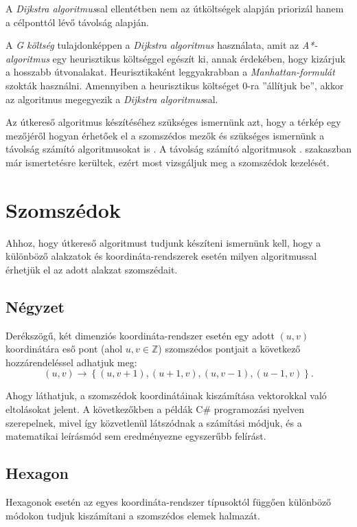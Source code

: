 A \textit{Dijkstra algoritmus}sal ellentétben nem az útköltségek alapján priorizál hanem a célponttól lévő távolság alapján.

A \textit{G költség} tulajdonképpen a \textit{Dijkstra algoritmus} használata, amit az \textit{A*-algo\-rit\-mus} egy heurisztikus költséggel egészít ki, annak érdekében, hogy kizárjuk a hosszabb útvonalakat. Heurisztikaként leggyakrabban a \textit{Manhattan-formulát} szokták használni. Amennyiben a heurisztikus költséget 0-ra ''állítjuk be'', akkor az algoritmus megegyezik a \textit{Dijkstra algoritmus}sal.

Az útkereső algoritmus készítéséhez szükséges ismernünk azt, hogy a térkép egy mezőjéről hogyan érhetőek el a szomszédos mezők és szükséges ismernünk a távolság számító algoritmusokat is \cite{A*}. A távolság számító algoritmusok . szakaszban már ismertetésre kerültek, ezért most vizsgáljuk meg a szomszédok kezelését.

\section{Szomszédok}

Ahhoz, hogy útkereső algoritmust tudjunk készíteni ismernünk kell, hogy a különböző alakzatok és koordináta-rendszerek esetén milyen algoritmussal érhetjük el az adott alakzat szomszédait. 

\subsection{Négyzet}

Derékszögű, két dimenziós koordináta-rendszer esetén egy adott $(u, v)$ koordinátára eső pont (ahol $u, v \in \mathbb{Z}$) szomszédos pontjait a következő hozzárendeléssel adhatjuk meg:
$$
(u, v) \rightarrow
\left\{
(u, v+1), (u+1, v), (u, v-1), (u-1, v)
\right\}.
$$

Ahogy láthatjuk, a szomszédok koordinátáinak kiszámítása vektorokkal való eltolásokat jelent. A következőkben a példák C\# programozási nyelven szerepelnek, mivel így közvetlenül látszódnak a számítási módjuk, és a matematikai leírásmód sem eredményezne egyszerűbb felírást.

\subsection{Hexagon}

Hexagonok esetén az egyes koordináta-rendszer típusoktól függően különböző módokon tudjuk kiszámítani a szomszédos elemek halmazát.

